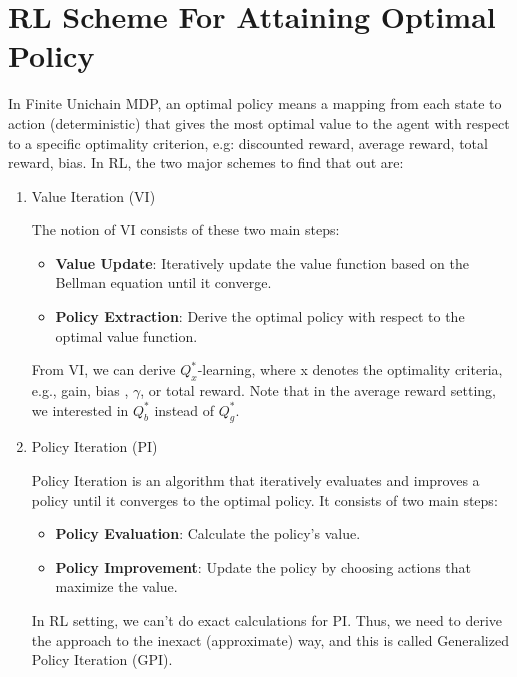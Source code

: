 \section{RL Scheme For Attaining Optimal Policy}
In Finite Unichain MDP, an optimal policy means a mapping from each state to action (deterministic) that gives the most optimal value to the agent with respect to a specific optimality criterion, e.g: discounted reward, average reward, total reward, bias. In RL, the two major schemes to find that out are:

\begin{enumerate}
    \item Value Iteration (VI)
    
    The notion of VI consists of these two main  steps:
    \begin{itemize}
        \item \textbf{Value Update}: Iteratively update the value function based on the Bellman equation until it converge.
        \item \textbf{Policy Extraction}: Derive the optimal policy with respect to the optimal value function.
    \end{itemize}
    
    From VI, we can derive \( Q_x^* \)-learning, where x denotes the optimality criteria, e.g., gain, bias , $\gamma$, or total reward. Note that in the average reward setting, we interested in \( Q_b^* \) instead of \( Q_g^* \).
    
    \vspace{0.4cm}

    \item Policy Iteration (PI)
    
    Policy Iteration is an algorithm that iteratively evaluates and improves a policy until it converges to the optimal policy. It consists of two main steps:
    \begin{itemize}
        \item \textbf{Policy Evaluation}: Calculate the policy's value.
        \item \textbf{Policy Improvement}: Update the policy by choosing actions that maximize the value.
    \end{itemize}
    
    In RL setting, we can't do exact calculations for PI. Thus, we need to derive the approach to the inexact (approximate) way, and this is called Generalized Policy Iteration (GPI).
    
\end{enumerate}

